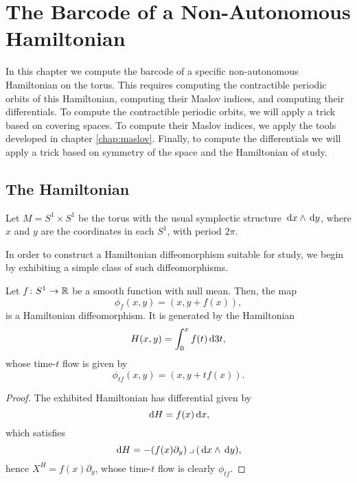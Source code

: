 \chapter{The Barcode of a Non-Autonomous Hamiltonian}
\label{chap:firstexample}

In this chapter we compute the barcode of a specific non-autonomous Hamiltonian on the torus. This requires computing the contractible periodic orbits of this Hamiltonian, computing their Maslov indices, and computing their differentials. To compute the contractible periodic orbits, we will apply a trick based on covering spaces. To compute their Maslov indices, we apply the tools developed in chapter \ref{chap:maslov}. Finally, to compute the differentials we will apply a trick based on symmetry of the space and the Hamiltonian of study.

\section{The Hamiltonian}

Let $M = S^1 \times S^1$ be the torus with the usual symplectic structure $\dl x \wedge \dl y$, where $x$ and $y$ are the coordinates in each $S^1$, with period $2\pi$.

In order to construct a Hamiltonian diffeomorphism suitable for study, we begin by exhibiting a simple class of such diffeomorphisms.

\begin{lemma}
Let $f \colon S^1 \to \mathbb{R}$ be a smooth function with null mean. Then, the map
\begin{equation}
\phi_f(x,y) = (x, y + f(x)),
\end{equation}
is a Hamiltonian diffeomorphism. It is generated by the Hamiltonian
\begin{equation}
H(x,y) = \int_0^x f(t) \dl3 t,
\end{equation}
whose time-$t$ flow is given by
\begin{equation}
\phi_{tf}(x,y) = (x, y + t f(x)).
\end{equation}
\end{lemma}

\begin{proof}
The exhibited Hamiltonian has differential given by
\begin{equation}
\dl H = f(x) \dl x,
\end{equation}
which satisfies
\begin{equation}
\dl H = - (f(x) \partial_y) \into (\dl x \wedge \dl y),
\end{equation}
hence $X^H = f(x) \partial_y$, whose time-$t$ flow is clearly $\phi_{tf}$.
\end{proof}

